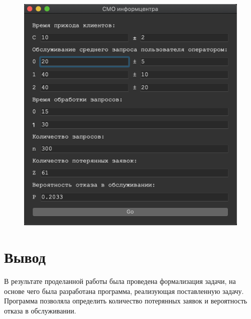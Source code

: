 \documentclass[a4paper,12pt]{article}
\begin{document}
\begin{figure}[h!]
\begin{minipage}[b]{0.32\textwidth}
		\end{minipage}
		\begin{minipage}[b]{0.32\textwidth}
			\includegraphics[width=\textwidth]{3.png}
		\end{minipage}
		\label{ris:smo}
	\end{figure}
	
	\section*{Вывод}
	
	В результате проделанной работы была проведена формализация задачи, на основе чего была разработана программа, реализующая поставленную задачу.
	Программа позволяла определить количество потерянных заявок и вероятность отказа в обслуживании.
	
\end{document}
